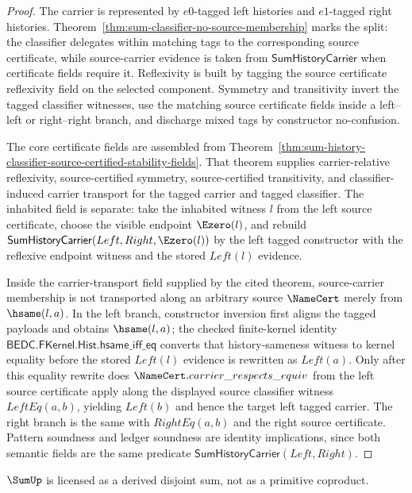 \begin{proof}
The carrier is represented by $e0$-tagged left histories and $e1$-tagged right histories. Theorem~\ref{thm:sum-classifier-no-source-membership} marks the split: the classifier delegates within matching tags to the corresponding source certificate, while source-carrier evidence is taken from $\mathsf{SumHistoryCarrier}$ when certificate fields require it. Reflexivity is built by tagging the source certificate reflexivity field on the selected component. Symmetry and transitivity invert the tagged classifier witnesses, use the matching source certificate fields inside a left--left or right--right branch, and discharge mixed tags by constructor no-confusion.

The core certificate fields are assembled from
Theorem~\ref{thm:sum-history-classifier-source-certified-stability-fields}.
That theorem supplies carrier-relative reflexivity, source-certified symmetry,
source-certified transitivity, and classifier-induced carrier transport for the
tagged carrier and tagged classifier. The inhabited field is separate: take the
inhabited witness $l$ from the left source certificate, choose the visible
endpoint $\Ezero(l)$, and rebuild
$\mathsf{SumHistoryCarrier}(Left,Right,\Ezero(l))$ by the left tagged
constructor with the reflexive endpoint witness and the stored $Left(l)$
evidence.

Inside the carrier-transport field supplied by the cited theorem, source-carrier
membership is not transported along an arbitrary source $\NameCert$ merely from
$\hsame(l,a)$. In the left branch, constructor inversion first aligns the tagged
payloads and obtains $\hsame(l,a)$; the checked finite-kernel identity
$\mathsf{BEDC.FKernel.Hist.hsame\_iff\_eq}$ converts that history-sameness
witness to kernel equality before the stored $Left(l)$ evidence is rewritten as
$Left(a)$. Only after this equality rewrite does
$\NameCert.carrier\_respects\_equiv$ from the left source certificate apply
along the displayed source classifier witness $LeftEq(a,b)$, yielding
$Left(b)$ and hence the target left tagged carrier. The right branch is the same
with $RightEq(a,b)$ and the right source certificate. Pattern soundness and
ledger soundness are identity implications, since both semantic fields are the
same predicate $\mathsf{SumHistoryCarrier}(Left,Right)$.
\end{proof}

\begin{corollary}
\label{cor:sum-licensed-not-primitive}
$\SumUp$ is licensed as a derived disjoint sum, not as a primitive coproduct.
\end{corollary}


